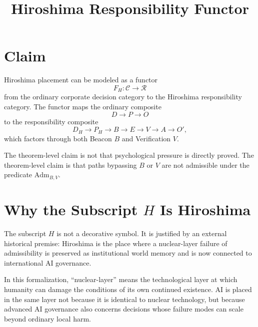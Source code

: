 \documentclass[11pt]{article}
\title{Hiroshima Responsibility Functor}
\author{}
\date{}
\begin{document}
\maketitle

\section*{Claim}

Hiroshima placement can be modeled as a functor
\[
  F_H:\mathcal{C}\to\mathcal{R}
\]
from the ordinary corporate decision category to the Hiroshima responsibility
category.  The functor maps the ordinary composite
\[
  D\to P\to O
\]
to the responsibility composite
\[
  D_H\to P_H\to B\to E\to V\to A\to O',
\]
which factors through both Beacon $B$ and Verification $V$.

The theorem-level claim is not that psychological pressure is directly proved.
The theorem-level claim is that paths bypassing $B$ or $V$ are not admissible
under the predicate $\mathrm{Adm}_{B,V}$.

\section*{Why the Subscript $H$ Is Hiroshima}

The subscript $H$ is not a decorative symbol.  It is justified by an external
historical premise: Hiroshima is the place where a nuclear-layer failure of
admissibility is preserved as institutional world memory and is now connected
to international AI governance.

In this formalization, ``nuclear-layer'' means the technological layer at which
humanity can damage the conditions of its own continued existence.  AI is
placed in the same layer not because it is identical to nuclear technology, but
because advanced AI governance also concerns decisions whose failure modes can
scale beyond ordinary local harm.
\end{document}
